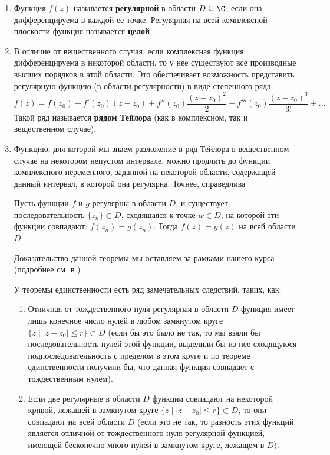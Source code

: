 \begin{enumerate}
\item Функция $f(z)$ называется \textbf{регулярной} в области $D\subseteq\C$, если она дифференцируема в каждой ее точке. Регулярная на всей комплексной плоскости функция называется \textbf{целой}.

\item В отличие от вещественного случая, если комплексная функция дифференцируема в некоторой области, то у нее существуют все производные высших порядков в этой области. Это обеспечивает возможность представить регулярную функцию (в области регулярности) в виде степенного ряда:
$$
f(z) = f(z_0)+f'(z_0)(z-z_0)+f''(z_0)\frac{(z-z_0)^2}{2}+f'''(z_0)\frac{(z-z_0)^3}{3!}+\dots
$$
Такой ряд называется \textbf{рядом Тейлора} (как в комплексном, так и вещественном случае).

\item Функцию, для которой мы знаем разложение в ряд Тейлора в вещественном случае на некотором непустом интервале, можно продлить до функции комплексного переменного, заданной на некоторой области, содержащей данный интервал, в которой она регулярна. Точнее, справедлива
\begin{thrm}[единственности]
Пусть функции $f$ и $g$ регулярны в области $D$, и существует последовательность $\{z_n\}\subset D$, сходящаяся к точке $w\in D$, на которой эти функции совпадают: $f(z_n)=g(z_n)$. Тогда $f(z)=g(z)$ на всей области $D$.
\end{thrm}
Доказательство данной теоремы мы оставляем за рамками нашего курса (подробнее см. в \cite{Domrin})

У теоремы единственности есть ряд замечательных следствий, таких, как:
\begin{enumerate}
\item Отличная от тождественного нуля регулярная в области $D$ функция имеет лишь конечное число нулей в любом замкнутом круге $\{z\mid|z-z_0|\le r\}\subset D$ (если бы это было не так, то мы взяли бы последовательность нулей этой функции, выделили бы из нее сходящуюся подпоследовательность с пределом в этом круге и по теореме единственности получили бы, что данная функция совпадает с тождественным нулем).

\item Если две регулярные в области $D$ функции совпадают на некоторой кривой, лежащей в замкнутом круге $\{z\mid|z-z_0|\le r\}\subset D$, то они совпадают на всей области $D$ (если это не так, то разность этих функций является отличной от тождественного нуля регулярной функцией, имеющей бесконечно много нулей в замкнутом круге, лежащем в $D$).
\end{enumerate}


\end{enumerate}
